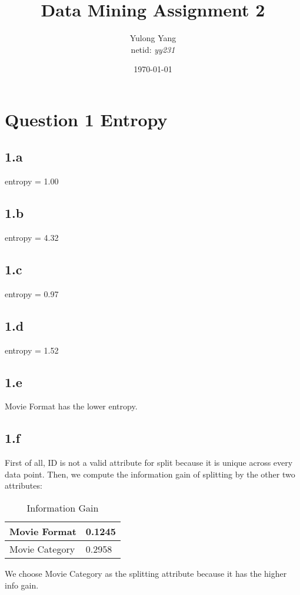 \documentclass[paper=a4, fontsize=11pt]{scrartcl} %
\title{Data Mining Assignment 2}
\author{Yulong Yang\\ netid: \textit{yy231}} %
\date{\normalsize\today} %
\begin{document}
\maketitle %

\section*{Question 1 Entropy}

\subsection*{1.a} entropy = 1.00
\subsection*{1.b} entropy = 4.32
\subsection*{1.c} entropy = 0.97
\subsection*{1.d} entropy = 1.52
\subsection*{1.e} Movie Format has the lower entropy.
\subsection*{1.f} First of all, ID is not a valid attribute for split because it is unique across every data point. Then, we compute the information gain of splitting by the other two attributes:

\begin{table}[htdp]
\caption{Information Gain}
\begin{center}
\begin{tabular}{| l | l |} \hline
Movie Format & 0.1245 \\ \hline
Movie Category & 0.2958 \\ \hline
\end{tabular}
\end{center}
\label{t1}
\end{table}%

We choose Movie Category as the splitting attribute because it has the higher info gain.
\end{document}

